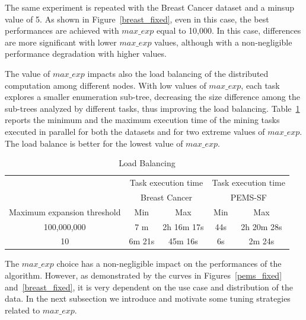 The same experiment is repeated with the Breast Cancer dataset and a minsup value of 5. As shown in Figure~\ref{breast_fixed}, even in this case, the best performances are achieved with $max\_exp$ equal to 10,000. In this case, differences are more significant with lower $max\_exp$ values, although with a non-negligible performance degradation with higher values. 

The value of $max\_exp$ impacts also the load balancing 
of the distributed computation among different nodes.
With low values of $max\_exp$, each task explores a
smaller enumeration sub-tree, decreasing the size difference
among the sub-trees analyzed by different tasks,
thus improving the load balancing.
Table~\ref{load balance breast} reports the minimum and the maximum execution time of
the mining tasks executed in parallel for both the datasets and for two extreme values of $max\_exp$. 
The load balance is better for the lowest value of $max\_exp$.



\begin{table}
\begin{center}
\caption{Load Balancing}
\label{load balance breast}
\begin{tabular}{ |c| c | c| c| c| }
\hline
							    &
\multicolumn{2}{|c|}{Task execution time}    & \multicolumn{2}{|c|}{Task execution time}      \\ 
 & \multicolumn{2}{|c|}{Breast Cancer}    & \multicolumn{2}{|c|}{PEMS-SF}      \\ \hline \hline
	Maximum expansion threshold &   Min          & Max    &   Min          & Max          \\ \hline
	100,000,000                 &    7 m                      & 2h 16m 17s &    44s                      & 2h 20m 28s
  \\ \hline
10                         &    6m 21s                      &        45m 16s  &   6s                      &        2m 24s
 \\ \hline
\end{tabular}
\end{center}
\end{table}





The $max\_exp$ choice has a non-negligible impact on the performances of the algorithm. However, as demonstrated by the curves in Figures~\ref{pems_fixed} and~\ref{breast_fixed}, it is very dependent on the use case and distribution of the data.
In the next subsection we introduce and motivate some tuning strategies related to $max\_exp$.

